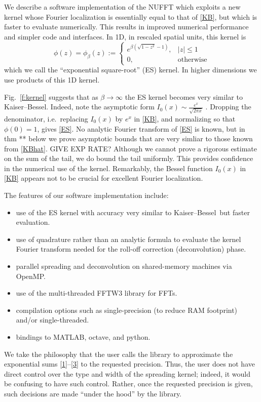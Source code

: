 \documentclass[10pt]{article}
\newcommand{\bi}{\begin{itemize}}
\newcommand{\ei}{\end{itemize}}
\newcommand{\be}{\begin{equation}}
\newcommand{\ee}{\end{equation}}
\newcommand{\KB}{Kaiser--Bessel}
\newcommand{\freq}{\beta}          %
\begin{document}
We describe a software implementation of the NUFFT
which exploits a new kernel whose Fourier localization 
is essentially equal to that of \eqref{KB},
but which is faster to evaluate numerically.
This results in improved numerical performance and simpler code and interfaces.
In 1D, in rescaled spatial units, this kernel is
\be
\phi(z) = \phi_\freq(z) :=
\left\{\begin{array}{ll}
e^{\freq (\sqrt{1-z^2}-1)}, & |z|\le 1\\
0, & \mbox{otherwise}
\end{array}
\right.
\label{ES}
\ee
which we call the ``exponential square-root'' (ES) kernel.
In higher dimensions we use products of this 1D kernel.

Fig.~\ref{f:kernel} suggests that as $\freq\to\infty$ the ES kernel
becomes very similar to \KB.
Indeed, note the asymptotic form
$I_0(x) \sim \frac{e^x}{\sqrt{2\pi x}}$ \cite[(10.30.4)]{dlmf}.
Dropping the denominator, i.e.\ replacing $I_0(x)$ by $e^x$ in \eqref{KB},
and normalizing so that $\phi(0)=1$, gives \eqref{ES}.
No analytic Fourier transform of \eqref{ES} is known,
but in thm ** below we prove asymptotic
bounds that are very simliar to those known
from \eqref{KBhat}.
GIVE EXP RATE?
Although we cannot prove a rigorous estimate on the sum of the tail,
we do bound the tail uniformly.
This provides confidence in the numerical use of the kernel.
Remarkably, the Bessel function $I_0(x)$ in \eqref{KB}
appears not to be crucial for excellent Fourier localization.


The features of our software implementation include:
\bi
\item use of the ES kernel with accuracy very similar to \KB\ but
  faster evaluation.
\item use of quadrature rather than an analytic formula to evaluate
  the kernel Fourier transform needed for the roll-off correction
  (deconvolution) phase.
\item parallel spreading and deconvolution on shared-memory machines via OpenMP.
\item use of the multi-threaded FFTW3 library for FFTs.
\item compilation options such as single-precision (to reduce RAM footprint)
  and/or single-threaded.
\item bindings to MATLAB, octave, and python.
\ei

We take the philosophy that the user calls the library to approximate the
exponential sums \eqref{1}--\eqref{3} to the requested precision.
Thus, the user does not have direct control over the type and width of
the spreading kernel; indeed, it would be confusing to have such control.
Rather, once the requested precision is given, such decisions
are made ``under the hood'' by the library.
\end{document}
